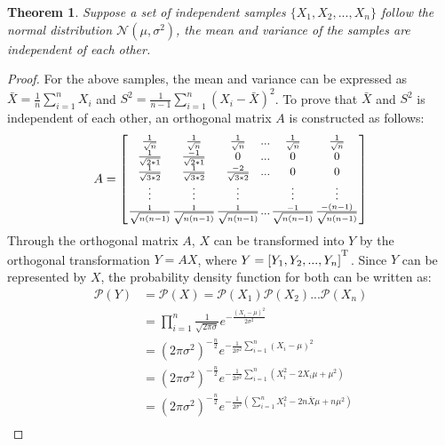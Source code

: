 \documentclass[letterpaper]{article} %
\begin{document}
\newtheorem{theorem}{Theorem}
\begin{theorem}
	Suppose a set of independent samples $\{X_1, X_2, ... ,X_n\}$ follow the normal distribution $\mathcal{N}(\mu, \sigma^2)$, the mean and variance of the samples are independent of each other. 
\end{theorem}
\begin{proof}
	For the above samples, the mean and variance can be expressed as $\bar{X}=\frac{1}{n}\sum_{i=1}^{n}X_i$ and $S^2=\frac{1}{n-1}\sum_{i=1}^{n}(X_i-\bar{X})^2$. To prove that $\bar{X}$ and $S^2$ is independent of each other, an orthogonal matrix $A$ is constructed as follows:
	\begin{equation} \small  \setlength{\arraycolsep}{0.5pt} 
		A = \left[ {\begin{array}{cccccc} 
				\frac{1}{\sqrt{n}} & \frac{1}{\sqrt{n}} & \frac{1}{\sqrt{n}} & ... & \frac{1}{\sqrt{n}} & \frac{1}{\sqrt{n}} \\
				\frac{1}{\sqrt{2*1}} & \frac{-1}{\sqrt{2*1}} & 0 & ... & 0 & 0 \\
				\frac{1}{\sqrt{3*2}} & \frac{1}{\sqrt{3*2}} & \frac{-2}{\sqrt{3*2}} & ... & 0 & 0 \\
				\vdots & \vdots & \vdots & & \vdots & \vdots \\
				\frac{1}{\sqrt{n(n-1)}} & \frac{1}{\sqrt{n(n-1)}} & \frac{1}{\sqrt{n(n-1)}} & ... & \frac{-1}{\sqrt{n(n-1)}} & \frac{-(n-1)}{\sqrt{n(n-1)}} \\
		\end{array} } \right]
	\end{equation}
	Through the orthogonal matrix $A$, $X$ can be transformed into $Y$ by the orthogonal transformation $Y=AX$, where $Y=[Y_1, Y_2, ..., Y_n]^\textsuperscript{T}$. Since $Y$ can be represented by $X$, the probability density function for both can be written as: 
	\begin{equation}
		\begin{array}{cl}
			\mathcal{P}(Y)&=\mathcal{P}(X)=\mathcal{P}(X_1)\mathcal{P}(X_2)...\mathcal{P}(X_n) \\
			&=\prod_{i=1}^{n}\frac{1}{\sqrt{2\pi \sigma}}e^{-\frac{(X_i-\mu)^2}{2\sigma^2}} \\
			&=(2\pi\sigma^2)^{-\frac{n}{2}}e^{-\frac{1}{2\sigma^2}\sum_{i=1}^{n}(X_i-\mu)^2} \\
			&=(2\pi\sigma^2)^{-\frac{n}{2}}e^{-\frac{1}{2\sigma^2}\sum_{i=1}^{n}(X_i^2-2X_i\mu+\mu^2)} \\
			&=(2\pi\sigma^2)^{-\frac{n}{2}}e^{-\frac{1}{2\sigma^2}(\sum_{i=1}^{n}X_i^2-2n\bar{X}\mu+n\mu^2)} \\

\end{array}
\end{equation}
\end{proof}
\end{document}
